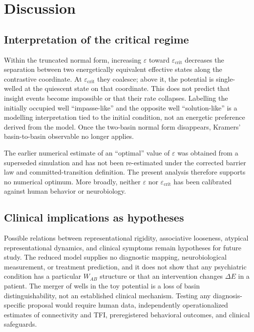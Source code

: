 \documentclass[a4paper,twocolumn,10pt]{article}
\newcommand{\eps}{\varepsilon}
\newcommand{\dE}{\Delta E}
\begin{document}
\section{Discussion}
\label{sec:discussion}

\subsection{Interpretation of the critical regime}

Within the truncated normal form, increasing $\eps$ toward $\eps_{\mathrm{crit}}$ decreases the
separation between two energetically equivalent effective states along the contrastive coordinate.
At $\eps_{\mathrm{crit}}$ they coalesce; above it, the potential is single-welled at the quiescent
state on that coordinate. This does not predict that insight events become impossible or that their
rate collapses. Labelling the initially occupied well ``impasse-like'' and the opposite well
``solution-like'' is a modelling interpretation tied to the initial condition, not an energetic
preference derived from the model. Once the two-basin normal form disappears, Kramers'
basin-to-basin observable no longer applies.

The earlier numerical estimate of an ``optimal'' value of $\eps$ was obtained from a superseded
simulation and has not been re-estimated under the corrected barrier law and committed-transition
definition. The present analysis therefore supports no numerical optimum. More broadly, neither
$\eps$ nor $\eps_{\mathrm{crit}}$ has been calibrated against human behavior or neurobiology.

\subsection{Clinical implications as hypotheses}

Possible relations between representational rigidity, associative looseness, atypical
representational dynamics, and clinical symptoms remain hypotheses for future study. The reduced
model supplies no diagnostic mapping, neurobiological measurement, or treatment prediction, and it
does not show that any psychiatric condition has a particular $W_{AB}$ structure or that an
intervention changes $\dE$ in a patient. The merger of wells in the toy potential is a loss of basin
distinguishability, not an established clinical mechanism. Testing any diagnosis-specific proposal
would require human data, independently operationalized estimates of connectivity and TFI,
preregistered behavioral outcomes, and clinical safeguards.
\end{document}
